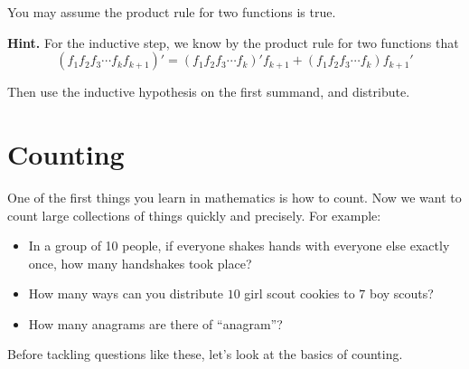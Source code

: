 \documentclass[10pt,]{book}
\theoremstyle{plain}
\theoremstyle{definition}
\theoremstyle{definition}
\theoremstyle{definition}
\theoremstyle{definition}
\numberwithin{equation}{chapter}
\begin{document}
\begin{exerciselist}
\begin{equation*}
\end{equation*}
%
\par
\hypertarget{p-512}{}%
You may assume the product rule for two functions is true.%
\par\smallskip
\par\smallskip%
\noindent\textbf{Hint.}\hypertarget{hint-2}{}\quad%
\hypertarget{p-513}{}%
For the inductive step, we know by the product rule for two functions that%
\begin{equation*}
(f_1f_2f_3 \cdots f_k f_{k+1})' = (f_1f_2f_3\cdots f_k)'f_{k+1} + (f_1f_2f_3\cdots f_k)f_{k+1}'
\end{equation*}
%
\par
\hypertarget{p-514}{}%
Then use the inductive hypothesis on the first summand, and distribute.%
\end{exerciselist}
\typeout{************************************************}
\typeout{************************************************}
\chapter[{Counting}]{Counting}\label{ch_counting}
\hypertarget{p-515}{}%
One of the first things you learn in mathematics is how to count. Now we want to count large collections of things quickly and precisely. For example: \leavevmode%
\begin{itemize}[label=\textbullet]
\item{}\hypertarget{p-516}{}%
In a group of 10 people, if everyone shakes hands with everyone else exactly once, how many handshakes took place?%
\item{}\hypertarget{p-517}{}%
How many ways can you distribute \(10\) girl scout cookies to \(7\) boy scouts?%
\item{}\hypertarget{p-518}{}%
How many anagrams are there of ``anagram''?%
\end{itemize}
%
\par
\hypertarget{p-519}{}%
Before tackling questions like these, let's look at the basics of counting.%
\typeout{************************************************}
\typeout{************************************************}
\end{document}
